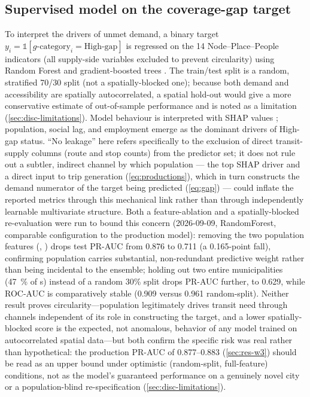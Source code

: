 \subsection{Supervised model on the coverage-gap target}
To interpret the drivers of unmet demand, a binary target
$y_i = \mathbb{1}[g\text{-category}_i = \text{High-gap}]$ is regressed on the
\num{14} Node--Place--People indicators (all supply-side variables excluded to
prevent circularity) using Random Forest and gradient-boosted trees
\parencite{niu2023rf,ke2017lightgbm}. The train/test split is a random, stratified
70/30 split (not a spatially-blocked one); because both demand and accessibility are
spatially autocorrelated, a spatial hold-out would give a more conservative estimate
of out-of-sample performance and is noted as a limitation
(\cref{sec:disc-limitations}). Model behaviour is interpreted with SHAP
values \parencite{lundberg2017shap}; population, social lag, and employment emerge
as the dominant drivers of High-gap status. ``No leakage'' here refers specifically to
the exclusion of direct transit-supply columns (route and stop counts) from the predictor
set; it does not rule out a subtler, indirect channel by which population --- the top
SHAP driver and a direct input to trip generation (\cref{eq:productions}), which in turn
constructs the demand numerator of the target being predicted (\cref{eq:gap}) --- could
inflate the reported metrics through this mechanical link rather than through independently
learnable multivariate structure. Both a feature-ablation and a spatially-blocked
re-evaluation were run to bound this concern (2026-09-09, RandomForest, comparable
configuration to the production model): removing the two population features
(, ) drops test PR-AUC from
\num{0.876} to \num{0.711} (a \num{0.165}-point fall), confirming population carries
substantial, non-redundant predictive weight rather than being incidental to the
ensemble; holding out two entire municipalities (\SI{47}{\percent} of \ageb{}s) instead
of a random 30\% split drops PR-AUC further, to \num{0.629}, while ROC-AUC is
comparatively stable (\num{0.909} versus \num{0.961} random-split). Neither result
proves circularity---population legitimately drives transit need through channels
independent of its role in constructing the target, and a lower spatially-blocked score
is the expected, not anomalous, behavior of any model trained on autocorrelated spatial
data---but both confirm the specific risk was real rather than hypothetical: the
production PR-AUC of \num{0.877}--\num{0.883} (\cref{sec:res-w3}) should be read as an
upper bound under optimistic (random-split, full-feature) conditions, not as the
model's guaranteed performance on a genuinely novel city or a population-blind
re-specification (\cref{sec:disc-limitations}).


